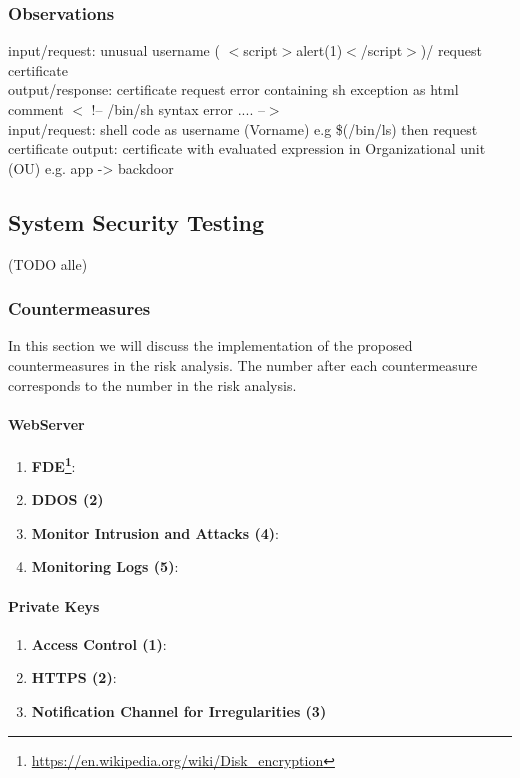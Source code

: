 \documentclass[english]{article}
\begin{document}
\subsubsection*{Observations}
input/request: unusual username ( $<$script$>$alert(1)$<$/script$>$)/ request certificate\\
output/response:  certificate request error containing sh exception as html comment $<$ !-- /bin/sh syntax error .... --$>$\\
input/request: shell code as username (Vorname) e.g \$(/bin/ls) then request certificate
output: certificate with evaluated expression in Organizational unit (OU) e.g. app -> backdoor


\subsection{System Security Testing} (TODO alle)


\subsubsection{Countermeasures}
In this section we will discuss the implementation of the proposed countermeasures in the risk analysis. The number after each countermeasure corresponds to the number in the risk analysis.

\paragraph{WebServer}
\begin{enumerate}[label=(\alph*)] \item \textbf{FDE\footnote{\url{https://en.wikipedia.org/wiki/Disk_encryption}}}:
\item \textbf{DDOS (2)}
\item \textbf{Monitor Intrusion and Attacks (4)}:
\item \textbf{Monitoring Logs (5)}:
\end{enumerate} 

\paragraph{Private Keys}
\begin{enumerate}[label=(\alph*)]
\item \textbf{Access Control (1)}:
\item \textbf{HTTPS (2)}:
\item \textbf{Notification Channel for Irregularities (3)}
\end{enumerate} 
\end{document}

